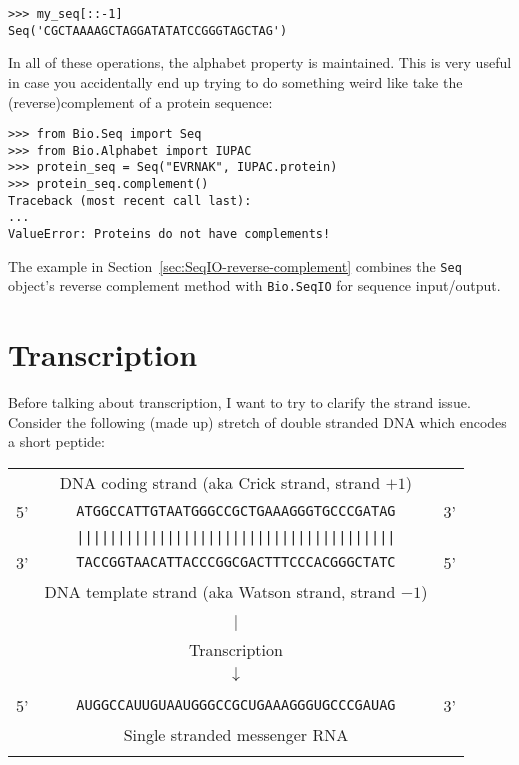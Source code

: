 \begin{verbatim}
>>> my_seq[::-1]
Seq('CGCTAAAAGCTAGGATATATCCGGGTAGCTAG')
\end{verbatim}

In all of these operations, the alphabet property is maintained. This is very
useful in case you accidentally end up trying to do something weird like take
the (reverse)complement of a protein sequence:

\begin{verbatim}
>>> from Bio.Seq import Seq
>>> from Bio.Alphabet import IUPAC
>>> protein_seq = Seq("EVRNAK", IUPAC.protein)
>>> protein_seq.complement()
Traceback (most recent call last):
...
ValueError: Proteins do not have complements!
\end{verbatim}

The example in Section~\ref{sec:SeqIO-reverse-complement} combines the \verb|Seq|
object's reverse complement method with \verb|Bio.SeqIO| for sequence input/output.

\section{Transcription}
Before talking about transcription, I want to try to clarify the strand issue.
Consider the following (made up) stretch of double stranded DNA which
encodes a short peptide:

\begin{tabular}{rcl}
\\
   & {\small DNA coding strand (aka Crick strand, strand $+1$)} & \\
5' & \texttt{ATGGCCATTGTAATGGGCCGCTGAAAGGGTGCCCGATAG} & 3' \\
   & \texttt{|||||||||||||||||||||||||||||||||||||||} & \\
3' & \texttt{TACCGGTAACATTACCCGGCGACTTTCCCACGGGCTATC} & 5' \\
   & {\small DNA template strand (aka Watson strand, strand $-1$)} & \\
\\
   & {\LARGE $|$} &\\
   & Transcription & \\
   & {\LARGE $\downarrow$} &\\
\\
5' & \texttt{AUGGCCAUUGUAAUGGGCCGCUGAAAGGGUGCCCGAUAG} & 3' \\
   & {\small Single stranded messenger RNA} & \\
\\
\end{tabular}

